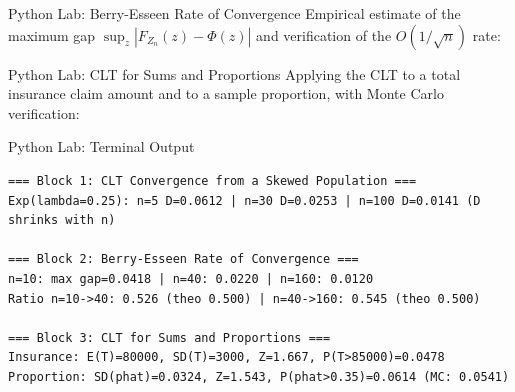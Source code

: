 \documentclass[aspectratio=169,xcolor={dvipsnames,table}]{beamer}
\begin{document}
\begin{frame}[fragile]{Python Lab: Berry-Esseen Rate of Convergence}
	\vspace{-0.05cm}
	\scriptsize
	Empirical estimate of the maximum gap $\sup_z|F_{Z_n}(z)-\Phi(z)|$ and verification of the $O(1/\sqrt n)$ rate:
	{
	}
\end{frame}

\begin{frame}[fragile]{Python Lab: CLT for Sums and Proportions}
	\vspace{-0.05cm}
	\scriptsize
	Applying the CLT to a total insurance claim amount and to a sample proportion, with Monte Carlo verification:
	{
	}
\end{frame}

\begin{frame}[fragile]{Python Lab: Terminal Output}
	\vspace{-0.1cm}
	\begin{block}{}
		\fontsize{4pt}{5pt}\selectfont
		\begin{verbatim}
=== Block 1: CLT Convergence from a Skewed Population ===
Exp(lambda=0.25): n=5 D=0.0612 | n=30 D=0.0253 | n=100 D=0.0141 (D shrinks with n)

=== Block 2: Berry-Esseen Rate of Convergence ===
n=10: max gap=0.0418 | n=40: 0.0220 | n=160: 0.0120
Ratio n=10->40: 0.526 (theo 0.500) | n=40->160: 0.545 (theo 0.500)

=== Block 3: CLT for Sums and Proportions ===
Insurance: E(T)=80000, SD(T)=3000, Z=1.667, P(T>85000)=0.0478
Proportion: SD(phat)=0.0324, Z=1.543, P(phat>0.35)=0.0614 (MC: 0.0541)
		\end{verbatim}
	\end{block}
\end{frame}
\end{document}
